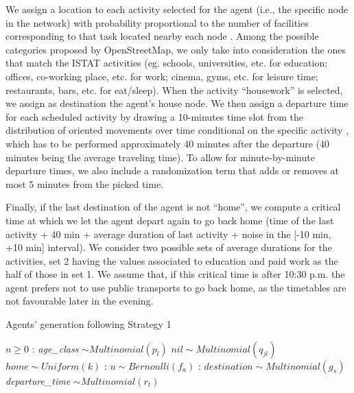 We assign a location to each activity selected for the agent (i.e., the specific node in the network) with probability proportional to the number of facilities corresponding to that task located nearby each node \cite{site9}. Among the possible categories proposed by OpenStreetMap, we only take into consideration the ones that match the ISTAT activities (eg. schools, universities, etc. for education; offices, co-working place, etc. for work; cinema, gyms, etc. for leisure time; restaurants, bars, etc. for eat/sleep). When the activity “housework” is selected, we assign as destination the agent’s house node. We then assign a departure time for each scheduled activity by drawing a 10-minutes time slot from the distribution of oriented movements over time conditional on the specific activity \cite{site11}, which has to be performed approximately 40 minutes after the departure (40 minutes being the average traveling time). To allow for minute-by-minute departure times, we also include a randomization term that adds or removes at most 5 minutes from the picked time. 

Finally, if the last destination of the agent is not “home”, we compute a critical time at which we let the agent depart again to go back home (time of the last activity + 40 min + average duration of last activity \cite{site11} + noise in the [-10 min, +10 min] interval). We consider two possible sets of average durations for the activities, set 2 having the values associated to education and paid work as the half of those in set 1. We assume that, if this critical time is after 10:30 p.m. the agent prefers not to use public transports to go back home, as the timetables are not favourable later in the evening.

\begin{algorithm}
\caption{Agents' generation following Strategy 1}\label{alg1}
\begin{algorithmic}
\Require $n \geq 0$
:
\State \textit{age\_class} $\sim Multinomial(p_l)$ 
\State $nil \sim Multinomial(q_{jl})$ 
\State $home \sim Uniform(k)$ 
:
\State $ u \sim Bernoulli(f_a)$ 
:
    \State $destination \sim Multinomial(g_s)$ \\
    \State \textit{departure\_time} $\sim Multinomial(r_t)$ \\
\EndIf
\EndFor
\EndFor
\end{algorithmic}
\end{algorithm}

